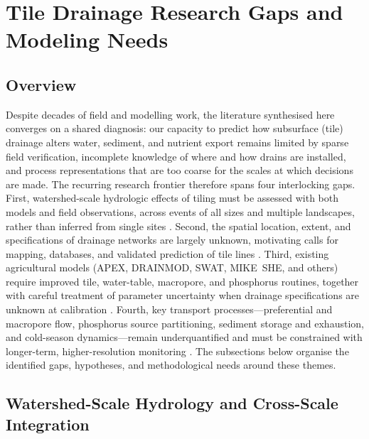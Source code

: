 \documentclass[11pt]{article}
\begin{document}
\section*{Tile Drainage Research Gaps and Modeling Needs}

\subsection{Overview}

Despite decades of field and modelling work, the literature synthesised here converges on a shared diagnosis: our capacity to predict how subsurface (tile) drainage alters water, sediment, and nutrient export remains limited by sparse field verification, incomplete knowledge of where and how drains are installed, and process representations that are too coarse for the scales at which decisions are made. The recurring research frontier therefore spans four interlocking gaps. First, watershed-scale hydrologic effects of tiling must be assessed with both models and field observations, across events of all sizes and multiple landscapes, rather than inferred from single sites \parencite{Schilling2008,Sloan2017,Sloan2016}. Second, the spatial location, extent, and specifications of drainage networks are largely unknown, motivating calls for mapping, databases, and validated prediction of tile lines \parencite{Naz2009,Zhou2025,Valayamkunnath2020}. Third, existing agricultural models (APEX, DRAINMOD, SWAT, MIKE~SHE, and others) require improved tile, water-table, macropore, and phosphorus routines, together with careful treatment of parameter uncertainty when drainage specifications are unknown at calibration \parencite{Williams2016,Bauwe2016,Guo2018b,Nelson2018}. Fourth, key transport processes---preferential and macropore flow, phosphorus source partitioning, sediment storage and exhaustion, and cold-season dynamics---remain underquantified and must be constrained with longer-term, higher-resolution monitoring \parencite{King2015,Grangeon2021,Trentman2020}. The subsections below organise the identified gaps, hypotheses, and methodological needs around these themes.

\subsection{Watershed-Scale Hydrology and Cross-Scale Integration}
\end{document}
